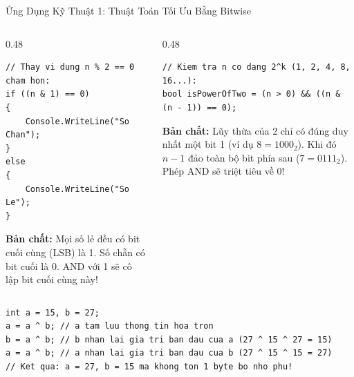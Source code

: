 \documentclass[aspectratio=169, 10pt]{beamer}
\begin{document}
\begin{frame}[fragile]{Ứng Dụng Kỹ Thuật 1: Thuật Toán Tối Ưu Bằng Bitwise}
  \begin{columns}[T]
    \begin{column}{0.48\textwidth}
      \begin{tcolorbox}[colback=UniLightBlue!30,colframe=UniBlue,title=\textbf{1. Kiểm tra Chẵn / Lẻ siêu tốc},fonttitle=\small\bfseries]
\begin{lstlisting}[numbers=none]
// Thay vi dung n % 2 == 0 cham hon:
if ((n & 1) == 0)
{
    Console.WriteLine("So Chan");
}
else
{
    Console.WriteLine("So Le");
}
\end{lstlisting}
        \footnotesize \textbf{Bản chất:} Mọi số lẻ đều có bit cuối cùng (LSB) là 1. Số chẵn có bit cuối là 0. AND với 1 sẽ cô lập bit cuối cùng này!
      \end{tcolorbox}
    \end{column}

    \begin{column}{0.48\textwidth}
      \begin{tcolorbox}[colback=CSharpPurple!10,colframe=CSharpPurple,title=\textbf{2. Kiểm tra Số Lũy thừa của 2},fonttitle=\small\bfseries]
\begin{lstlisting}[numbers=none]
// Kiem tra n co dang 2^k (1, 2, 4, 8, 16...):
bool isPowerOfTwo = (n > 0) && ((n & (n - 1)) == 0);
\end{lstlisting}
        \footnotesize \textbf{Bản chất:} Lũy thừa của 2 chỉ có đúng duy nhất một bit 1 (ví dụ $8 = 1000_2$). Khi đó $n - 1$ đảo toàn bộ bit phía sau ($7 = 0111_2$). Phép AND sẽ triệt tiêu về 0!
      \end{tcolorbox}
    \end{column}
  \end{columns}

  \vspace{2mm}
  \begin{tcolorbox}[colback=UniGreen!10,colframe=UniGreen,title=\textbf{3. Hoán đổi 2 số không cần biến phụ (XOR Swap Trick)},fonttitle=\small\bfseries]
\begin{lstlisting}[numbers=none]
int a = 15, b = 27;
a = a ^ b; // a tam luu thong tin hoa tron
b = a ^ b; // b nhan lai gia tri ban dau cua a (27 ^ 15 ^ 27 = 15)
a = a ^ b; // a nhan lai gia tri ban dau cua b (27 ^ 15 ^ 15 = 27)
// Ket qua: a = 27, b = 15 ma khong ton 1 byte bo nho phu!
\end{lstlisting}
  \end{tcolorbox}
\end{frame}
\end{document}
